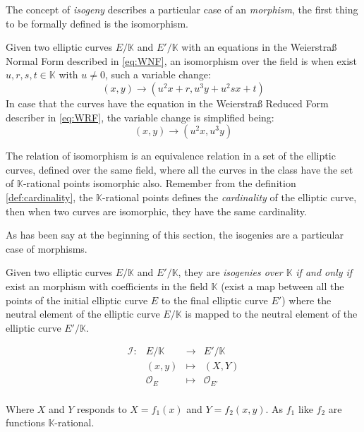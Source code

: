 \documentclass[10pt,a4paper,twoside]{llncs}
\begin{document}
The concept of \emph{isogeny} describes a particular case of an \emph{morphism}, the first thing to be formally defined is the isomorphism.

\begin{definition}\label{def:isomorphism}
 Given two elliptic curves $E/\mathbb{K}$ and $E'/\mathbb{K}$ with an equations in the Weierstra\ss{} Normal Form described in \ref{eq:WNF}, an isomorphism over the field is when exist $u,r,s,t\in\mathbb{K}$ with $u\neq0$, such a variable change:
\begin{equation}\label{eq:isomorphisminWNF}
 (x,y) \rightarrow (u^2x+r,u^3y+u^2sx+t)
\end{equation}
In case that the curves have the equation in the Weierstra\ss{} Reduced Form describer in \ref{eq:WRF}, the variable change is simplified being:
\begin{equation}\label{eq:isomorphisminWRF}
 (x,y) \rightarrow (u^2x,u^3y)
\end{equation}
\end{definition}

The relation of isomorphism is an equivalence relation in a set of the elliptic curves, defined over the same field, where all the curves in the class have the set of $\mathbb{K}$-rational points isomorphic also. Remember from the definition \ref{def:cardinality}, the $\mathbb{K}$-rational points defines the \emph{cardinality} of the elliptic curve, then when two curves are isomorphic, they have the same cardinality.

As has been say at the beginning of this section, the isogenies are a particular case of morphisms.

\begin{definition}\label{def:isogeny}
 Given two elliptic curves $E/\mathbb{K}$ and $E'/\mathbb{K}$, they are \emph{isogenies over $\mathbb{K}$} \emph{if and only if} exist an morphism with coefficients in the field $\mathbb{K}$ (exist a map between all the points of the initial elliptic curve $E$ to the final elliptic curve $E'$) where the neutral element of the elliptic curve $E/\mathbb{K}$ is mapped to the neutral element of the elliptic curve $E'/\mathbb{K}$.

\begin{equation}\label{eq:isogenia}
        \begin{array}{cccc}
                \mathcal{I}: & E/\mathbb{K} & \rightarrow & E'/\mathbb{K} \\
                \;           & (x,y)        & \mapsto     & (X,Y) \\
                \;           & \mathcal{O}_{E} & \mapsto  & \mathcal{O}_{E'} \\
        \end{array}
\end{equation}

Where $X$ and $Y$ responds to $X=f_{1}(x)$ and $Y=f_{2}(x,y)$. As $f_{1}$ like $f_{2}$ are functions $\mathbb{K}$-rational.
\end{definition}
\end{document}

